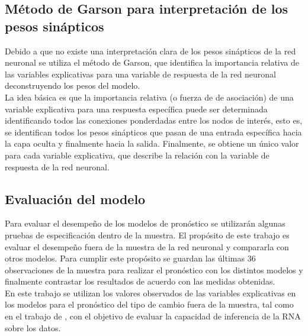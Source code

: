 \subsection{Método de Garson para interpretación de los pesos sinápticos}
Debido a que no existe una interpretación clara de los pesos sinápticos de la red neuronal se utiliza el método de Garson, que identifica la importancia relativa de las variables explicativas para una variable de respuesta de la red neuronal deconstruyendo los pesos del modelo.\\

La idea básica es que la importancia relativa (o fuerza de de asociación) de una variable explicativa para una respuesta específica puede ser determinada identificando todos las conexiones ponderdadas entre los nodos de interés, esto es, se identifican todos los pesos sinápticos que pasan de una entrada específica hacia la capa oculta y finalmente hacia la salida. Finalmente, se obtiene un único valor para cada variable explicativa, que describe la relación con la variable de respuesta de la red neuronal.


\subsection{Evaluación del modelo}
Para evaluar el desempeño de los modelos de pronóstico se utilizarán algunas pruebas de especificación dentro de la muestra. El propósito de este trabajo es evaluar el desempeño fuera de la muestra de la red neuronal y compararla con otros modelos. Para cumplir este propósito se guardan las últimas 36 observaciones de la muestra para realizar el pronóstico con los distintos modelos y finalmente contrastar los resultados de acuerdo con las medidas obtenidas.\\


En este trabajo se utilizan los valores observados de las variables explicativas en los modelos para el pronóstico del tipo de cambio fuera de la muestra, tal como en el trabajo de \textcite{meese1983empirical}, con el objetivo de evaluar la capacidad de inferencia de la RNA sobre los datos.

